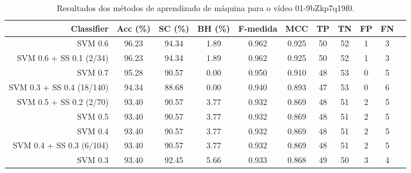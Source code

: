 \begin{table}[!htb]
\centering
\caption{Resultados dos métodos de aprendizado de máquina para o vídeo 01-9bZkp7q19f0.}
\label{tab:01-9bZkp7q19f0}
\begin{tabular}{r|c|c|c|c|c|c|c|c|c|c}
\hline\hline
Classifier & Acc (\%) & SC (\%) & BH (\%) & F-medida & MCC & TP & TN & FP & FN \\ \hline
SVM 0.6 & 96.23 & 94.34 & 1.89 & 0.962 & 0.925 & 50 & 52 & 1 & 3 \\ 
SVM 0.6 + SS 0.1 (2/34) & 96.23 & 94.34 & 1.89 & 0.962 & 0.925 & 50 & 52 & 1 & 3 \\ 
SVM 0.7 & 95.28 & 90.57 & 0.00 & 0.950 & 0.910 & 48 & 53 & 0 & 5 \\ 
SVM 0.3 + SS 0.4 (18/140) & 94.34 & 88.68 & 0.00 & 0.940 & 0.893 & 47 & 53 & 0 & 6 \\ 
SVM 0.5 + SS 0.2 (2/70) & 93.40 & 90.57 & 3.77 & 0.932 & 0.869 & 48 & 51 & 2 & 5 \\ 
SVM 0.5 & 93.40 & 90.57 & 3.77 & 0.932 & 0.869 & 48 & 51 & 2 & 5 \\ 
SVM 0.4 & 93.40 & 90.57 & 3.77 & 0.932 & 0.869 & 48 & 51 & 2 & 5 \\ 
SVM 0.4 + SS 0.3 (6/104) & 93.40 & 90.57 & 3.77 & 0.932 & 0.869 & 48 & 51 & 2 & 5 \\ 
SVM 0.3 & 93.40 & 92.45 & 5.66 & 0.933 & 0.868 & 49 & 50 & 3 & 4 \\ 
\hline\hline
\end{tabular}
\end{table}
